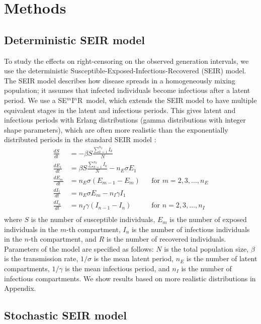 \documentclass[12pt]{article}
\newcommand{\seminar}{SE\mbox{$^m$}I\mbox{$^n$}R}
\begin{document}
\section{Methods}

\subsection{Deterministic SEIR model}

To study the effects on right-censoring on the observed generation intervals, we use the deterministic Susceptible-Exposed-Infectious-Recovered (SEIR) model.
The SEIR model describes how disease spreads in a homogeneously mixing population; it assumes that infected individuals become infectious after a latent period.
We use a \seminar\ model, which extends the SEIR model to have multiple equivalent stages in the latent and infectious periods. This gives latent and infectious periods with Erlang distributions (gamma distributions with integer shape parameters), which are often more realistic than the exponentially distributed periods in the standard SEIR model \citep{anderson1980spread, bailey1964some}: 
\begin{equation}
\begin{aligned}
\frac{dS}{dt} &= - \beta S \frac{\sum_{k=1}^{n_I} I_k}{N}\\
\frac{dE_1}{dt} &= \beta S \frac{\sum_{k=1}^{n_I} I_k}{N} - n_E \sigma E_1\\
\frac{dE_m}{dt} &= n_E \sigma (E_{m-1} - E_m) && \text{for } m = 2, 3, \dots, n_E\\
\frac{dI_1}{dt} &= n_E \sigma E_m - n_I \gamma I_1\\
\frac{dI_n}{dt} &= n_I \gamma (I_{n-1} - I_n) && \text{for } n = 2, 3, \dots, n_I\\
\end{aligned}
\end{equation}
where $S$ is the number of susceptible individuals, $E_m$ is the number of exposed individuals in the $m$-th compartment, $I_n$ is the number of infectious individuals in the $n$-th compartment, and $R$ is the number of recovered individuals.
Parameters of the model are specified as follows: $N$ is the total population size, $\beta$ is the transmission rate, $1/\sigma$ is the mean latent period, $n_E$ is the number of latent compartments, $1/\gamma$ is the mean infectious period, and $n_I$ is the number of infectious compartments.
We show results based on more realistic distributions in Appendix.

\subsection{Stochastic SEIR model}
\end{document}
